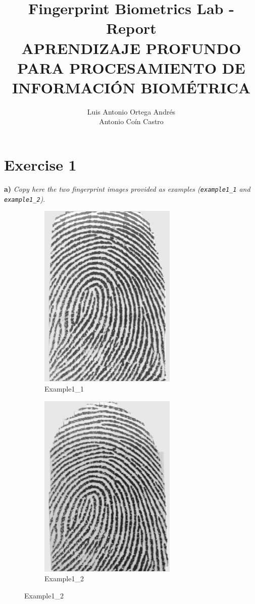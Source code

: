 \documentclass[11pt]{article}
\author{Luis Antonio Ortega Andrés\\Antonio Coín Castro}
\date{}
\title{Fingerprint Biometrics Lab - Report\\\medskip
\large APRENDIZAJE PROFUNDO PARA PROCESAMIENTO DE INFORMACIÓN BIOMÉTRICA}
\begin{document}
\maketitle

\section{Exercise 1}
\textbf{a) } \emph{Copy here the two fingerprint images provided as examples (\texttt{example1\_1} and \texttt{example1\_2})}.

\begin{figure}
  \centering
       \begin{subfigure}[b]{0.2\textwidth}
         \centering
         \includegraphics[scale=0.3]{example1_1.png}
         \caption{Example1\_1}
     \end{subfigure}
     \begin{subfigure}[b]{0.2\textwidth}
         \centering
         \includegraphics[scale=0.3]{example1_2.png}
         \caption{Example1\_2}
     \end{subfigure}
\end{figure}
\end{document}
